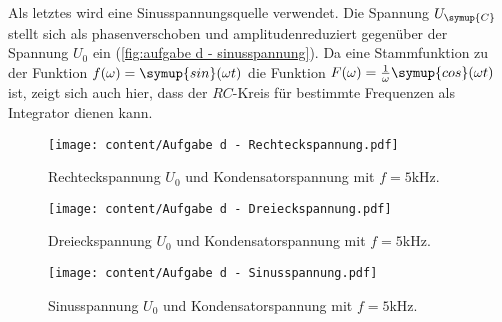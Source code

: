 Als letztes wird eine Sinusspannungsquelle verwendet. Die Spannung $U_{\symup{C}}$ stellt sich als phasenverschoben
und amplitudenreduziert gegenüber der Spannung $U_{0}$ ein (\autoref{fig:aufgabe d - sinusspannung}). Da eine
Stammfunktion zu der Funktion $f(\omega)=\symup{sin}(\omega t)$ die Funktion $F(\omega) = \frac{1}{\omega}\symup{cos}(\omega t)$ ist,
zeigt sich auch hier, dass der $RC$-Kreis für bestimmte Frequenzen als Integrator dienen kann.

\begin{figure}
  \centering
  \texttt{[image: content/Aufgabe d - Rechteckspannung.pdf]}
  \caption{Rechteckspannung $U_{0}$ und Kondensatorspannung mit $f=5$kHz.}
  \label{fig:aufgabe d - rechteckspannung}
\end{figure}

\begin{figure}
  \centering
  \texttt{[image: content/Aufgabe d - Dreieckspannung.pdf]}
  \caption{Dreieckspannung $U_{0}$ und Kondensatorspannung mit $f=5$kHz.}
  \label{fig:aufgabe d - dreieckspannung}
\end{figure}

\begin{figure}
  \centering
  \texttt{[image: content/Aufgabe d - Sinusspannung.pdf]}
  \caption{Sinusspannung $U_{0}$ und Kondensatorspannung mit $f=5$kHz.}
  \label{fig:aufgabe d - sinusspannung}
\end{figure}

